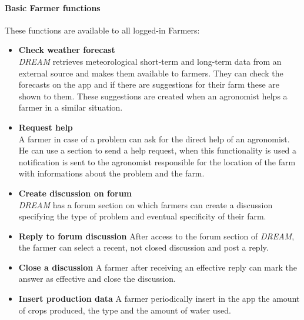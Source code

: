 \paragraph{Basic Farmer functions} These functions are available to all logged-in Farmers:
\begin{itemize}
    \item \textbf{Check weather forecast}\\
          \emph{DREAM} retrieves meteorological short-term and long-term data from an external source and makes them available 
          to farmers. They can check the forecasts on the app and if there are suggestions for their farm these are shown to them.
           These suggestions are created when an agronomist helps a farmer in a similar situation.
    \item \textbf{Request help}\\
          A farmer in case of a problem can ask for the direct help of an agronomist. He can use a section to send a help request,
           when this functionality is used a notification is sent to the agronomist responsible for the location of the farm with informations about the problem and the farm.
    \item \textbf{Create discussion on forum}\\
         \emph{DREAM} has a forum section on which farmers can create a discussion specifying the type of problem and eventual specificity of their farm. 
    \item \textbf{Reply to forum discussion}
        After access to the forum section of \emph{DREAM}, the farmer can select a recent, not closed discussion and post a reply.
    \item \textbf{Close a discussion}
        A farmer after receiving an effective reply can mark the answer as effective and close the discussion.
    \item \textbf{Insert production data}
        A farmer periodically insert in the app the amount of crops produced, the type and the amount of water used.
\end{itemize}

